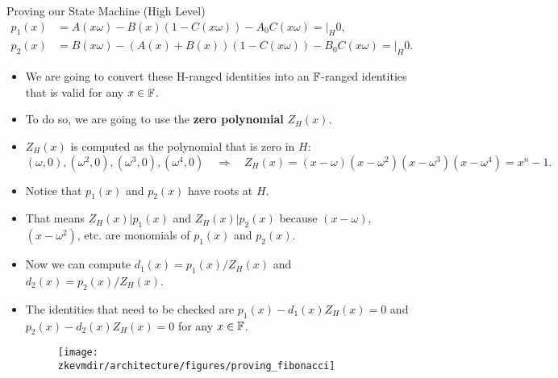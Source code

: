 \begin{frame}[allowframebreaks]{Proving our State Machine (High Level)}
\begin{align*}
p_1(x)&= A(x\omega) - B(x)(1 - C(x\omega)) - A_0C(x\omega) = \bigg\lvert_H 0,\\
p_2(x) &= B(x\omega) - (A(x) + B(x))(1 - C(x\omega)) - B_0 C(x\omega) = \bigg\lvert_H 0.
\end{align*}

\begin{itemize}
\item We are going to convert these H-ranged identities into an $\mathbb{F}$-ranged identities that 
is valid for any $x \in \mathbb{F}$.
\item To do so, we are going to use the \textbf{zero polynomial} $Z_H(x)$.
\item $Z_H(x)$ is computed as the polynomial that is zero in $H$:
\[
(\omega,0), (\omega^2,0), (\omega^3,0), (\omega^4,0) \quad \Longrightarrow \quad Z_H(x) = (x-\omega)(x-\omega^2)(x-\omega^3)(x-\omega^4) = x^n-1.
\]
\item Notice that $p_1(x)$ and $p_2(x)$ have roots at $H$.
\item That means $Z_H(x) | p_1(x)$ and $Z_H(x) | p_2(x)$ 
because $(x-\omega)$, $(x-\omega^2)$, etc. are monomials of $p_1(x)$ and  $p_2(x)$.
\item Now we can compute $d_1(x) = p_1(x) / Z_H(x)$ and $d_2(x) = p_2(x) / Z_H(x)$.
\item The identities that need to be checked are $p_1(x) - d_1(x)Z_H(x) = 0$ and $p_2(x) - d_2(x)Z_H(x) = 0$ 
for any $x \in \mathbb{F}$.
\begin{figure}
\texttt{[image: \\zkevmdir/architecture/figures/proving\_fibonacci]}
\end{figure}
\end{itemize}
\end{frame}
